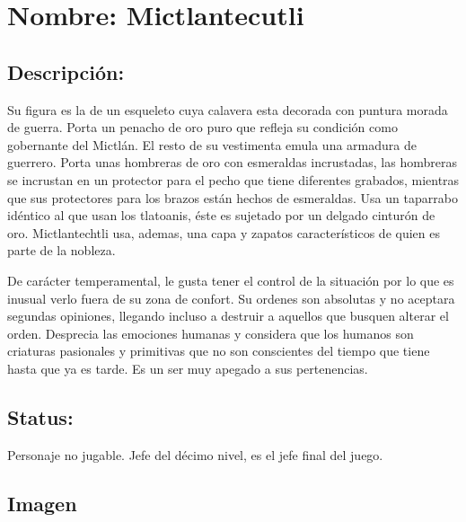 \section{Nombre: Mictlantecutli}  \label{per:mictlantecutli}
\subsection{Descripción:}   
Su figura es la de un esqueleto cuya calavera esta decorada con puntura morada de guerra. Porta un penacho de oro puro que refleja su condición como gobernante del Mictlán. El resto de su vestimenta emula una armadura de guerrero. Porta unas hombreras de oro con esmeraldas incrustadas, las hombreras se incrustan en un protector para el pecho que tiene diferentes grabados, mientras que sus protectores para los brazos están hechos de esmeraldas. Usa un taparrabo idéntico al que usan los tlatoanis, éste es sujetado por un delgado cinturón de oro. Mictlantechtli usa, ademas, una capa y zapatos característicos de quien es parte de la nobleza.
\\
\par
De carácter temperamental, le gusta tener el control de la situación por lo que es inusual verlo fuera de su zona de confort. Su ordenes son absolutas y no aceptara segundas opiniones, llegando incluso a destruir a aquellos que busquen alterar el orden. Desprecia las emociones humanas y considera que los humanos son criaturas pasionales y primitivas que no son conscientes del tiempo que tiene hasta que ya es tarde. Es un ser muy apegado a sus pertenencias. 
\subsection{Status:}
Personaje no jugable.
Jefe del décimo nivel, es el jefe final del juego.
\subsection{Imagen}

